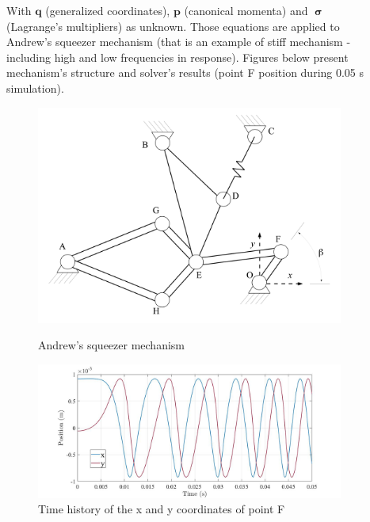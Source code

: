 \documentclass{beamer}
\newcommand{\bb}[1]{\mathbf{#1}}
\begin{document}
\begin{frame}
\begin{columns}
\begin{column}{0.425\paperwidth}
With $\bb{q}$ (generalized coordinates), $\bb{p}$ (canonical momenta) and $\bm{\upsigma}$ (Lagrange's multipliers) as unknown. Those equations are applied to Andrew's squeezer mechanism (that is an example of stiff mechanism - including high and low frequencies in response). Figures below present mechanism's structure and solver's results (point F position during 0.05 s simulation).

\begin{figure}
\centering
\begin{minipage}{0.38\textwidth}
  \centering
 \includegraphics[width=\textwidth]{Andrews_mech}
\caption{Andrew's squeezer mechanism}
  \label{fig:test1}
\end{minipage}%
\begin{minipage}{0.62\textwidth}
  \centering
\includegraphics[width=\textwidth]{Position_F}
\caption{Time history of the x and y coordinates of point F}
\end{minipage}
\end{figure}


\end{column}
\begin{column}{0.05\paperwidth}
\end{column}
\begin{column}{0.425\paperwidth}
\justifying


\end{column}
\end{columns}
\end{frame}
\end{document}
